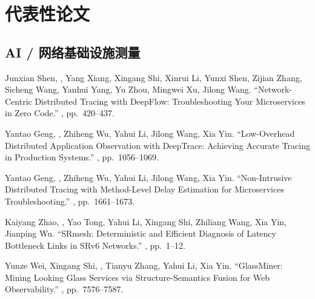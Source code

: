 \documentclass[11pt]{article}
\begin{document}
\section{代表性论文}
\subsection*{AI / 网络基础设施测量}
\begin{publist}

\item Junxian Shen, \corr, Yang Xiang, Xingang Shi, Xinrui Li, Yunxi
Shen, Zijian Zhang, Sicheng Wang, Yanhui Yang, Yu Zhou, Mingwei Xu, Jilong Wang.
``Network-Centric Distributed Tracing with DeepFlow: Troubleshooting Your
Microservices in Zero Code.'' , pp.~420--437.

\item Yantao Geng, \corr, Zhiheng Wu, Yahui Li, Jilong Wang, Xia Yin.
``Low-Overhead Distributed Application Observation with DeepTrace: Achieving Accurate
Tracing in Production Systems.'' , pp.~1056--1069.

\item Yantao Geng, \corr, Zhiheng Wu, Yahui Li, Jilong Wang, Xia Yin.
``Non-Intrusive Distributed Tracing with Method-Level Delay Estimation for
Microservices Troubleshooting.'' , pp.~1661--1673.

\item Kaiyang Zhao, \corr, Yao Tong, Yahui Li, Xingang Shi, Zhiliang
Wang, Xia Yin, Jianping Wu. ``SRmesh: Deterministic and Efficient Diagnosis of Latency
Bottleneck Links in SRv6 Networks.'' , pp.~1--12.

\item Yunze Wei, Xingang Shi, \corr, Tianyu Zhang, Yahui Li, Xia Yin.
``GlassMiner: Mining Looking Glass Services via Structure-Semantics Fusion for Web
Observability.'' , pp.~7576--7587.

\end{publist}
\end{document}
